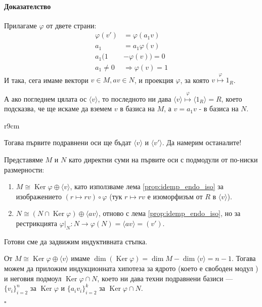 \documentclass{article}
\newif\ifusemulticols
\newif\ifmobileview
\theoremstyle{definition}
\theoremstyle{remark}
\theoremstyle{plain}
\theoremstyle{plain}
\newenvironment{mymulticols}
    { \ifusemulticols \begin{multicols}{2} \fi }
    { \ifusemulticols \end{multicols} \fi }
\newcommand\mywrapbegin[3]{\ifmobileview\else\begin{wrapfigure}[#1]{#2}{#3}\fi}
\newcommand\mywrapend{\ifmobileview\else\end{wrapfigure}\fi}
\newenvironment{myproof}{\paragraph{Доказателство}}{\hfill$\square$}
\DeclareMathOperator{\Ker}{Ker}
\begin{document}
\begin{mymulticols}
\begin{myproof}
    Прилагаме $\varphi$ от двете страни:
    \begin{align*}
        \varphi(v') &= \varphi(a_1v)\\
        a_1 &= a_1 \varphi(v)\\
        a_1 ( 1 &- \varphi(v) ) = 0\\
        a_1 \neq 0 &\Rightarrow \varphi(v) = 1
    \end{align*}
    И така, сега имаме вектори $v \in M, av \in N$, и проекция $\varphi$, за която $v
    \stackrel{\varphi}\mapsto 1_R$.

    А ако погледнем цялата ос $\langle v \rangle$, то последното ни дава $\langle v \rangle
    \stackrel{\varphi}\mapsto \langle 1_R \rangle = R$, което  подсказва, че ще искаме да вземем
    $v$ в базиса на $M$, а $v=a_1v$ - в базиса на $N$.

    \mywrapbegin{21}{r}{9cm}
    \mywrapend

    Тогава първите подравнени оси ще бъдат $\langle v \rangle$ и $\langle v' \rangle$.
    Да намерим останалите!

    Представяме $M$ и $N$ като директни суми на първите оси с подмодули от по-ниски размерности:

    \begin{enumerate}
        \item $M \cong \Ker \varphi \oplus \langle v \rangle$, като използваме %
            лема \ref{prop:idemp_endo_iso} за изображението $(r \mapsto rv) \circ \varphi$ (тук
            $r\mapsto rv$ е изоморфизъм от $R$ в $\langle v \rangle$).

        \item $N \cong (N \cap \Ker \varphi) \oplus \langle av \rangle$, отново с лема
            \ref{prop:idemp_endo_iso}, но за рестрикцията $\varphi|_N: N \to \varphi(N) = \langle av
            \rangle = \left(v'\right)$.
    \end{enumerate}

    Готови сме да задвижим индуктивната стъпка.

    От $M \cong \Ker \varphi \oplus \langle v \rangle$ имаме $\dim(\Ker \varphi) = \dim
    M-\dim \langle v \rangle = n - 1$. Тогава можем да приложим индукционната хипотеза за ядрото
    (което е свободен модул%
    ) и
    неговия подмоул $\Ker \varphi \cap N$, което ни дава техни подравнени базиси --- $\{ v_i
    \}_{i=2}^n$ за $\Ker \varphi$ и $\{ a_i v_i \}_{i=2}^k$ за $\Ker \varphi \cap N$.


\end{myproof}
\end{mymulticols}
\end{document}
